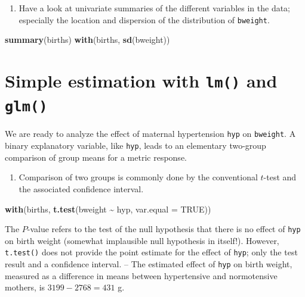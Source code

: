 \documentclass[
]{book}
\newenvironment{Shaded}{\begin{snugshade}}{\end{snugshade}}
\newcommand{\AttributeTok}[1]{\textcolor[rgb]{0.13,0.29,0.53}{#1}}
\newcommand{\ConstantTok}[1]{\textcolor[rgb]{0.56,0.35,0.01}{#1}}
\newcommand{\FunctionTok}[1]{\textcolor[rgb]{0.13,0.29,0.53}{\textbf{#1}}}
\newcommand{\NormalTok}[1]{#1}
\newcommand{\SpecialCharTok}[1]{\textcolor[rgb]{0.81,0.36,0.00}{\textbf{#1}}}
\providecommand{\tightlist}{%
  \setlength{\itemsep}{0pt}\setlength{\parskip}{0pt}}
\begin{document}
\begin{enumerate}
\def\labelenumi{\arabic{enumi}.}
\setcounter{enumi}{2}
\tightlist
\item
  Have a look at univariate summaries of the different
  variables in the data; especially
  the location and dispersion of the distribution of \texttt{bweight}.
\end{enumerate}

\begin{Shaded}
\begin{Highlighting}[]
\FunctionTok{summary}\NormalTok{(births)}
\FunctionTok{with}\NormalTok{(births, }\FunctionTok{sd}\NormalTok{(bweight))}
\end{Highlighting}
\end{Shaded}

\section{\texorpdfstring{Simple estimation with \texttt{lm()} and \texttt{glm()}}{Simple estimation with lm() and glm()}}\label{simple-estimation-with-lm-and-glm}

We are ready to analyze the effect of maternal hypertension \texttt{hyp} on \texttt{bweight}.
A binary explanatory variable, like \texttt{hyp}, leads to an elementary
two-group comparison of group
means for a metric response.

\begin{enumerate}
\def\labelenumi{\arabic{enumi}.}
\tightlist
\item
  Comparison of two groups is commonly done by the conventional \(t\)-test and
  the associated confidence interval.
\end{enumerate}

\begin{Shaded}
\begin{Highlighting}[]
\FunctionTok{with}\NormalTok{(births, }\FunctionTok{t.test}\NormalTok{(bweight }\SpecialCharTok{\textasciitilde{}}\NormalTok{ hyp, }\AttributeTok{var.equal =} \ConstantTok{TRUE}\NormalTok{))}
\end{Highlighting}
\end{Shaded}

The \(P\)-value refers to the test
of the null hypothesis that there is no effect of \texttt{hyp} on birth weight
(somewhat implausible null hypothesis in itself!).
However, \texttt{t.test()} does not provide
the point estimate for the effect of \texttt{hyp}; only the test result and a confidence interval. -- The estimated effect of \texttt{hyp} on birth weight,
measured as a difference in means between hypertensive and normotensive
mothers,
is \(3199-2768 = 431\) g.
\end{document}
